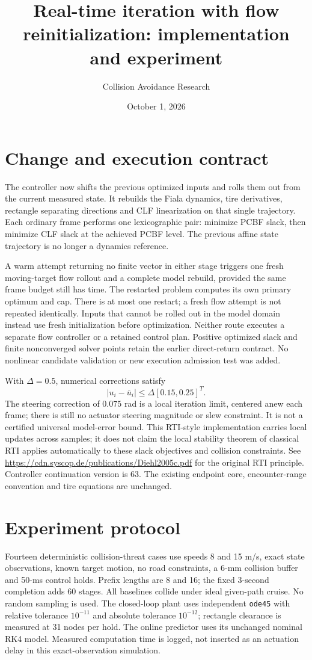 \documentclass[10pt]{article}
\title{Real-time iteration with flow reinitialization: implementation and experiment}
\author{Collision Avoidance Research}\date{October 1, 2026}
\begin{document}
\maketitle
\section{Change and execution contract}
The controller now shifts the previous optimized inputs and rolls them out from the current measured state. It rebuilds the Fiala dynamics, tire derivatives, rectangle separating directions and CLF linearization on that single trajectory. Each ordinary frame performs one lexicographic pair: minimize PCBF slack, then minimize CLF slack at the achieved PCBF level. The previous affine state trajectory is no longer a dynamics reference.

A warm attempt returning no finite vector in either stage triggers one fresh moving-target flow rollout and a complete model rebuild, provided the same frame budget still has time. The restarted problem computes its own primary optimum and cap. There is at most one restart; a fresh flow attempt is not repeated identically. Inputs that cannot be rolled out in the model domain instead use fresh initialization before optimization. Neither route executes a separate flow controller or a retained control plan. Positive optimized slack and finite nonconverged solver points retain the earlier direct-return contract. No nonlinear candidate validation or new execution admission test was added.

With $\Delta=0.5$, numerical corrections satisfy
\[
 |u_i-\bar u_i|\le\Delta[0.15,0.25]^T.
\]
The steering correction of $0.075$ rad is a local iteration limit, centered anew each frame; there is still no actuator steering magnitude or slew constraint. It is not a certified universal model-error bound. This RTI-style implementation carries local updates across samples; it does not claim the local stability theorem of classical RTI applies automatically to these slack objectives and collision constraints. See \url{https://cdn.syscop.de/publications/Diehl2005c.pdf} for the original RTI principle. Controller continuation version is 63. The existing endpoint core, encounter-range convention and tire equations are unchanged.

\section{Experiment protocol}
Fourteen deterministic collision-threat cases use speeds 8 and 15 m/s, exact state observations, known target motion, no road constraints, a 6-mm collision buffer and 50-ms control holds. Prefix lengths are 8 and 16; the fixed 3-second completion adds 60 stages. All baselines collide under ideal given-path cruise. No random sampling is used. The closed-loop plant uses independent \texttt{ode45} with relative tolerance $10^{-11}$ and absolute tolerance $10^{-12}$; rectangle clearance is measured at 31 nodes per hold. The online predictor uses its unchanged nominal RK4 model. Measured computation time is logged, not inserted as an actuation delay in this exact-observation simulation.
\end{document}
